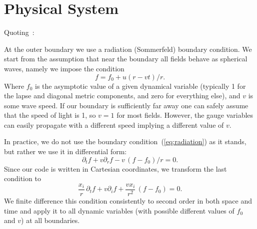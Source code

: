 \section{Physical System}
Quoting~\cite{SpacetimeX_NewRadX_Alcubierre:2002kk}:

At the outer boundary we use a radiation (Sommerfeld) boundary
condition.  We start from the assumption that near the boundary all
fields behave as spherical waves, namely we impose the condition
\begin{equation}
f = f_0 + u(r-vt)/r .
\label{eq:radiation}
\end{equation}
Where $f_0$ is the asymptotic value of a given dynamical variable
(typically 1 for the lapse and diagonal metric components, and zero
for everything else), and $v$ is some wave speed.  If our
boundary is sufficiently far away one can safely assume that the speed
of light is 1, so $v=1$ for most fields.  However, the gauge variables
can easily propagate with a different speed implying a different value
of $v$.

In practice, we do not use the boundary condition~(\ref{eq:radiation})
as it stands, but rather we use it in differential form:
\begin{equation}
\partial_t f + v \partial_r f - v \, (f - f_0)/r = 0 .
\end{equation}
Since our code is written in Cartesian coordinates, we transform the
last condition to
\begin{equation}
\frac{x_i}{r} \, \partial_t f + v \partial_i f + \frac{v x_i}{r^2} \,
\left( f - f_0 \right) = 0 .
\end{equation}
We finite difference this condition consistently to second order in
both space and time and apply it to all dynamic variables (with
possible different values of $f_0$ and $v$) at all boundaries.


